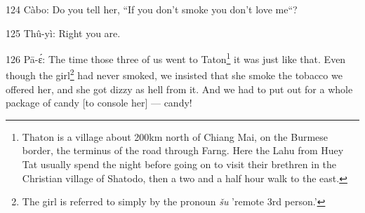 124 Càbo: Do you tell her, ``If you don't smoke you don't love me``?

125 Thû-yì: Right you are.

126 Pā-ɛ́: The time those three of us went to Taton\footnote{Thaton is a village about 200km north of Chiang Mai, on the Burmese border, the terminus of the road through Farng. Here the  Lahu from Huey Tat usually spend the night before going on to visit their brethren in the Christian village of Shatodo, then a two and a half hour walk to the east.} it was just like that.
Even though the girl\footnote{The girl is referred to simply by the pronoun \textit{šu} 'remote 3rd person.'} had never smoked, we insisted that she smoke the tobacco
we offered her, and she got dizzy as hell from it. And we had to put out for a
whole package of candy [to console her] --- candy!

